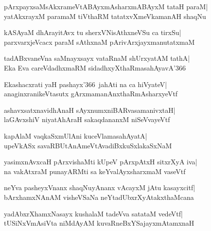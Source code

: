 \documentclass[twoside,12pt,openright]{book}
\newcounter{shloka}[chapter]
\begin{document}
\begin{shloka}%
pArxpayxsaMsAkxrameVtABAyxmAsharxmABAyxM tataH paraM|\\
yatAkxrayxM paramaM tiVthaRM tatatxvXmeVkamanAH shaqNu
\end{shloka}

\begin{shloka}%
kASAyaM dhArayitAvx tu sherxVNisAthxneVSu ca tirxSu|\\
parxvarxjeVcacx paraM sAthxnaM pArivArxjayxmanutatxmaM
\end{shloka}

\begin{shloka}%
tadABxvaneVna saMnayxsayx vataRnaM shUrxyatAM tathA|\\
Eka Eva careVdadhxmaRM sidadhxyXthaRmasahAyavA\char'366
\end{shloka}

\begin{shloka}%
Ekashacxrati yaH pashayx\char'366\ jahAti na ca hiVyateV|\\
anaginxranikeVtasutx gArxmamanAnxthaRmAsharxyeVtf
\end{shloka}

\begin{shloka}%
ashavxsatxnavidhAnaH sAyxnumxniBARvasamanivxtaH|\\
laGAvxshiV niyatAhAraH sakaqdananxM niSeVvayeVtf
\end{shloka}

\begin{shloka}%
kapAlaM vaqkaSxmUlAni kuceVlamasahAyatA|\\
upeVkASx savaRBUtAnAmeVtAvadiBxkuSxlakaSxNaM
\end{shloka}

\begin{shloka}%
yasimxnAvxcaH pArxvishaMti kUpeV pArxpAtxH sitxrXyA iva|\\
na vakAtxraM punayARMti sa keYvalAyxsharxmaM vaseVtf
\end{shloka}

\begin{shloka}%
neYva pasheyxVnanx shaqNuyAnanx vAcayxM jAtu kasayxcitf|\\
bArxhamxNAnAM visheVSaNa neYtadUbxrXyAtakxthaMcana
\end{shloka}

\begin{shloka}%
yadAbxrXhamxNasayx kushalaM tadeVva satataM vedeVtf|\\
tUSiNxVmAsiVta niMdAyAM kuvaRneBxYSajayxmAtamxnaH
\end{shloka}
\end{document}
